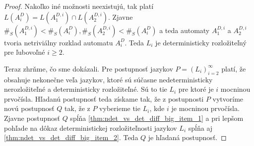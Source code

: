 \begin{proof}
Nakoľko iné možnosti neexistujú, tak platí $ L(A_i^D) = L(A_1^{D,i}) \cap L(A_2^{D,i}) $. Zjavne $ \#_S(A_1^{D,i}) < \#_S(A_i^D), \#_S(A_2^{D,i}) < \#_S(A_i^D) $ a teda automaty $ A_1^{D,i} $ a $ A_2^{D,i} $ tvoria netriviálny rozklad automatu $ A_i^D $. Teda $ L_i $ je deterministicky rozložiteľný pre ľubovoľné $ i \geq 2 $.
\par
Teraz zhrňme, čo sme dokázali. Pre postupnosť jazykov $ P=(L_i)_{i=2}^{\infty} $ platí, že obsahuje nekonečne veľa jazykov, ktoré sú súčasne nedeterministicky nerozložiteľné a deterministicky rozložiteľné. Sú to tie $ L_i $ pre ktoré je $ i $ mocninou prvočísla. Hľadanú postupnosť teda získame tak, že z postupnosti $ P $ vytvoríme novú postupnosť $ Q $ tak, že z $ P $ vyberieme tie $ L_i $, kde $ i $ je mocninou prvočísla. Zjavne postupnosť $ Q $ spĺňa \ref{thm:ndet_vs_det_diff_big_item_1} a pri lepšom pohľade na dôkaz deterministickej rozložiteľnosti jazykov $ L_i $ spĺňa aj \ref{thm:ndet_vs_det_diff_big_item_2}. Teda $ Q $ je hľadaná postupnosť.

\end{proof}















